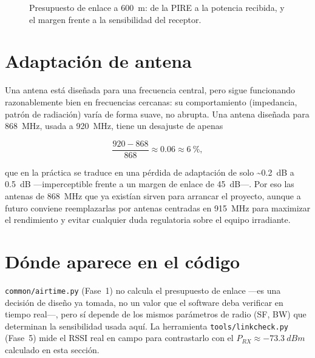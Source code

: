 \begin{figure}[h]
  \centering
  \caption{Presupuesto de enlace a \SI{600}{m}: de la PIRE a la potencia recibida, y el margen
    frente a la sensibilidad del receptor.}
\end{figure}

\section{Adaptación de antena}

Una antena está diseñada para una frecuencia central, pero sigue funcionando razonablemente
bien en frecuencias cercanas: su comportamiento (impedancia, patrón de radiación) varía de
forma suave, no abrupta. Una antena diseñada para \SI{868}{MHz}, usada a \SI{920}{MHz}, tiene
un desajuste de apenas

\[
  \frac{920 - 868}{868} \approx 0.06 \approx \SI{6}{\percent},
\]

que en la práctica se traduce en una pérdida de adaptación de solo \textasciitilde\SI{0.2}{dB}
a \SI{0.5}{dB} —imperceptible frente a un margen de enlace de \SI{45}{dB}—. Por eso las
antenas de \SI{868}{MHz} que ya existían sirven para arrancar el proyecto, aunque a futuro
conviene reemplazarlas por antenas centradas en \SI{915}{MHz} para maximizar el rendimiento y
evitar cualquier duda regulatoria sobre el equipo irradiante.

\section{Dónde aparece en el código}

\texttt{common/airtime.py} (Fase~1) no calcula el presupuesto de enlace —es una decisión de
diseño ya tomada, no un valor que el software deba verificar en tiempo real—, pero sí depende
de los mismos parámetros de radio (SF, BW) que determinan la sensibilidad usada aquí. La
herramienta \texttt{tools/linkcheck.py} (Fase~5) mide el RSSI real en campo para contrastarlo
con el $P_{RX} \approx \SI{-73.3}{dBm}$ calculado en esta sección.
